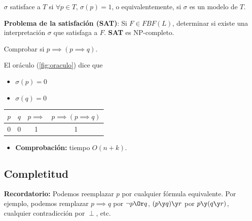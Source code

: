 \begin{defn}[Satisfación]
	$\sigma$ satisface a $T$ si $\forall p \in T$, $\sigma(p) = 1$, o equivalentemente, si $\sigma$ es un modelo de $T$.
\end{defn}

\begin{mdframed}
	\textbf{Problema de la satisfación (SAT)}: Si $F\in FBF(L)$, determinar si existe una interpretación $\sigma$ que satisfaga a $F$. \textbf{SAT} es {NP-completo}.
\end{mdframed}

\begin{example}
	Comprobar si $p\implies (p\implies q)$.
	
	El oráculo (\ref{fig:oraculo}) dice que
	\vspace{-3mm}
	\begin{itemize}
		\item $\sigma(p) = 0$
		\item $\sigma(q) = 0$
	\end{itemize}
	\begin{center}
		\begin{tabular}{|c|c|c|c|}
			\hline
			$p$ & $q$ & $p\implies$ & $p\implies(p\implies q)$\\
			\hline
			0 & 0 & 1 & 1\\
			\hline 		
		\end{tabular}
	\end{center}
	\begin{itemize}
		\item \textbf{Comprobación:} tiempo $O(n+k)$.
	\end{itemize}
\end{example}
\subsection{Completitud}
\textbf{Recordatorio:} Podemos reemplazar $p$ por cualquier fórmula equivalente. Por ejemplo, podemos remplazar $p\implies q$ por $\neg p \Or q$, $(p\y q)\y r$ por $p\y (q\y r)$, cualquier contradicción por $\perp$, etc.


